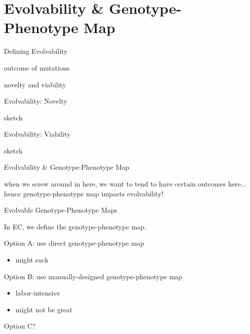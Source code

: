 \section{Evolvability \& Genotype-Phenotype Map}

\begin{frame}{Defining Evolvability}

outcome of mutations

novelty and viability

\end{frame}

\begin{frame}{Evolvability: Novelty}

sketch

\end{frame}

\begin{frame}{Evolvability: Viability}

sketch

\end{frame}

\begin{frame}{Evolvability \& Genotype-Phenotype Map}

when we screw around in here, we want to tend to have certain outcomes here...
hence genotype-phenotype map impacts evolvability!

\end{frame}

\begin{frame}{Evolvable Genotype-Phenotype Maps}

In EC, we define the genotype-phenotype map.

Option A: use direct genotype-phenotype map
\begin{itemize}
\item might suck
\end{itemize}

Option B: use manually-designed genotype-phenotype map
\begin{itemize}
\item labor-intensive
\item might not be great
\end{itemize}

Option C?

\end{frame}
